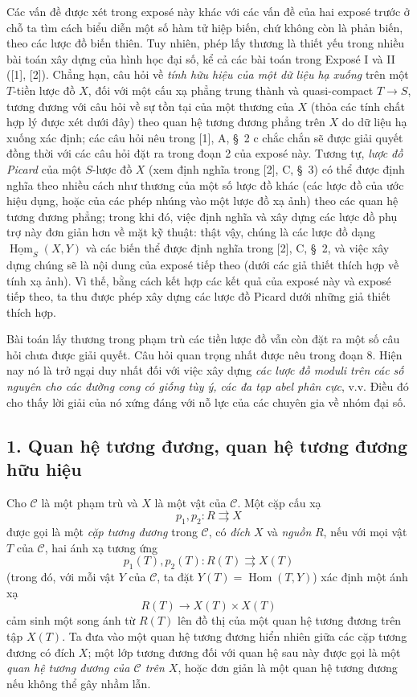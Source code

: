 \documentclass[11pt,twoside,openany]{book}
\numberwithin{equation}{section}
\newcommand{\src}[1]{%
  \phantomsection\hypertarget{src:\fgasourceid:#1}{}%
  \marginpar{\raggedleft\footnotesize\sffamily #1}%
}
\newcommand{\fgasourceid}{unset}
\begin{document}
Các vấn đề được xét trong exposé này khác với các vấn đề của hai exposé trước
ở chỗ ta tìm cách biểu diễn một số hàm tử hiệp biến, chứ không còn là phản
biến, theo các lược đồ biến thiên. Tuy nhiên, phép lấy thương là thiết yếu
trong nhiều bài toán xây dựng của hình học đại số, kể cả các bài toán trong
Exposé I và II ([1], [2]). Chẳng hạn, câu hỏi về \emph{tính hữu hiệu của một
dữ liệu hạ xuống} trên một $T$-tiền lược đồ $X$, đối với một cấu xạ phẳng
trung thành và quasi-compact $T\longrightarrow S$, tương đương với câu hỏi về
sự tồn tại của một thương của $X$ (thỏa các tính chất hợp lý được xét dưới
đây) theo quan hệ tương đương phẳng trên $X$ do dữ liệu hạ xuống xác định; các
câu hỏi nêu trong [1], A, \S~2 c chắc chắn sẽ được giải quyết đồng thời với
các câu hỏi đặt ra trong đoạn 2 của exposé này. Tương tự, \emph{lược đồ
Picard} của một $S$-lược đồ $X$ (xem định nghĩa trong [2], C, \S~3) có thể
được định nghĩa theo nhiều cách như thương của một số lược đồ khác (các lược
đồ của ước hiệu dụng, hoặc của các phép nhúng vào một lược đồ xạ ảnh) theo
các quan hệ tương đương phẳng; trong khi đó, việc định nghĩa và xây dựng các
lược đồ phụ trợ này đơn giản hơn về mặt kỹ thuật: thật vậy, chúng là các lược
đồ dạng $\underline{\operatorname{Hom}}_S(X,Y)$ và các biến thể được định
nghĩa trong [2], C, \S~2, và việc xây dựng chúng sẽ là nội dung của exposé
tiếp theo (dưới các giả thiết thích hợp về tính xạ ảnh). Vì thế, bằng cách kết
hợp các kết quả của exposé này và exposé tiếp theo, ta thu được phép xây dựng
các lược đồ Picard dưới những giả thiết thích hợp.

Bài toán lấy thương trong phạm trù các tiền lược đồ vẫn còn đặt ra một số câu
hỏi chưa được giải quyết. Câu hỏi quan trọng nhất được nêu trong đoạn 8. Hiện
nay nó là trở ngại duy nhất đối với việc xây dựng \emph{các lược đồ moduli
trên các số nguyên cho các đường cong có giống tùy ý, các đa tạp abel phân
cực}, v.v. Điều đó cho thấy lời giải của nó xứng đáng với nỗ lực của các
chuyên gia về nhóm đại số.
\src{100}
\subsection*{1. Quan hệ tương đương, quan hệ tương đương hữu hiệu}

Cho $\mathcal C$ là một phạm trù và $X$ là một vật của $\mathcal C$. Một cặp
cấu xạ
\[
  p_1,p_2:R\rightrightarrows X
\]
được gọi là một \emph{cặp tương đương} trong $\mathcal C$, có \emph{đích}
$X$ và \emph{nguồn} $R$, nếu với mọi vật $T$ của $\mathcal C$, hai ánh xạ
tương ứng
\[
  p_1(T),p_2(T):R(T)\rightrightarrows X(T)
\]
(trong đó, với mỗi vật $Y$ của $\mathcal C$, ta đặt
$Y(T)=\operatorname{Hom}(T,Y)$) xác định một ánh xạ
\[
  R(T)\longrightarrow X(T)\times X(T)
\]
cảm sinh một song ánh từ $R(T)$ lên đồ thị của một quan hệ tương đương trên
tập $X(T)$. Ta đưa vào một quan hệ tương đương hiển nhiên giữa các cặp tương
đương có đích $X$; một lớp tương đương đối với quan hệ sau này được gọi là
một \emph{quan hệ tương đương của $\mathcal C$ trên $X$}, hoặc đơn giản là
một quan hệ tương đương nếu không thể gây nhầm lẫn.
\end{document}
